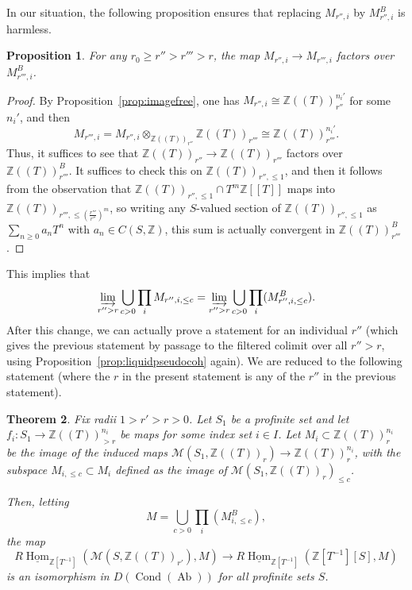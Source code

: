 \documentclass[11pt]{amsbook}
\DeclareMathOperator{\Hom}{Hom}
\newcommand{\intHom}{\underline{\Hom}}
\DeclareMathOperator{\Cond}{Cond}
\DeclareMathOperator{\Ab}{Ab}
\numberwithin{equation}{section}
\newtheorem{theorem}{Theorem}
\numberwithin{theorem}{section}
\newtheorem{proposition}[theorem]{Proposition}
\theoremstyle{definition}
\begin{document}
In our situation, the following proposition ensures that replacing $M_{r'',i}$ by $M_{r'',i}^B$ is harmless.

\begin{proposition} For any $r_0\geq r''>r'''>r$, the map $M_{r'',i}\to M_{r''',i}$ factors over $M_{r''',i}^B$.
\end{proposition}

\begin{proof} By Proposition~\ref{prop:imagefree}, one has $M_{r'',i}\cong \mathbb Z((T))_{r''}^{n_i'}$ for some $n_i'$, and then
\[
M_{r''',i}=M_{r'',i}\otimes_{\mathbb Z((T))_{r''}} \mathbb Z((T))_{r'''}\cong \mathbb Z((T))_{r'''}^{n_i'}.
\]
Thus, it suffices to see that $\mathbb Z((T))_{r''}\to \mathbb Z((T))_{r'''}$ factors over $\mathbb Z((T))_{r'''}^B$. It suffices to check this on $\mathbb Z((T))_{r'',\leq 1}$, and then it follows from the observation that $\mathbb Z((T))_{r'',\leq 1}\cap T^m\mathbb Z[[T]]$ maps into $\mathbb Z((T))_{r''',\leq (\frac{r'''}{r''})^m}$, so writing any $S$-valued section of $\mathbb Z((T))_{r'',\leq 1}$ as $\sum_{n\geq 0} a_n T^n$ with $a_n\in C(S,\mathbb Z)$, this sum is actually convergent in $\mathbb Z((T))_{r'''}^B$.
\end{proof}

This implies that
\[
\varinjlim_{r''>r} \bigcup_{c>0} \prod_i M_{r'',i,\leq c} = \varinjlim_{r''>r} \bigcup_{c>0} \prod_i (M_{r'',i,\leq c}^B).
\]
After this change, we can actually prove a statement for an individual $r''$ (which gives the previous statement by passage to the filtered colimit over all $r''>r$, using Proposition~\ref{prop:liquidpseudocoh} again). We are reduced to the following statement (where the $r$ in the present statement is any of the $r''$ in the previous statement).

\begin{theorem} Fix radii $1>r'>r>0$. Let $S_1$ be a profinite set and let $f_i: S_1\to \mathbb Z((T))_{>r}^{n_i}$ be maps for some index set $i\in I$. Let $M_i\subset \mathbb Z((T))_r^{n_i}$ be the image of the induced maps $\mathcal M(S_1,\mathbb Z((T))_r)\to \mathbb Z((T))_r^{n_i}$, with the subspace $M_{i,\leq c}\subset M_i$ defined as the image of $\mathcal M(S_1,\mathbb Z((T))_r)_{\leq c}$.

Then, letting
\[
M=\bigcup_{c>0} \prod_i (M_{i,\leq c}^B),
\]
the map
\[
R\intHom_{\mathbb Z[T^{-1}]}(\mathcal M(S,\mathbb Z((T))_{r'}),M)\to R\intHom_{\mathbb Z[T^{-1}]}(\mathbb Z[T^{-1}][S],M)
\]
is an isomorphism in $D(\Cond(\Ab))$ for all profinite sets $S$.
\end{theorem}
\end{document}
